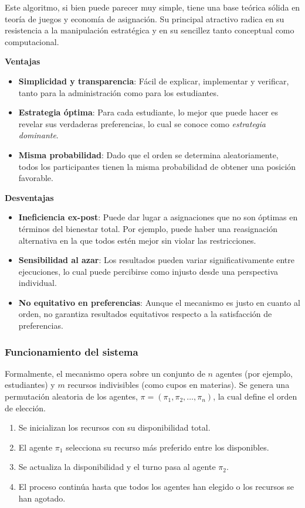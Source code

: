 \documentclass{article}
\begin{document}
Este algoritmo, si bien puede parecer muy simple, tiene una base teórica sólida en teoría de juegos y economía de asignación. Su principal atractivo radica en su resistencia a la manipulación estratégica y en su sencillez tanto conceptual como computacional.

\textbf{Ventajas}
\begin{itemize}
    \item \textbf{Simplicidad y transparencia}: Fácil de explicar, implementar y verificar, tanto para la administración como para los estudiantes.
    \item \textbf{Estrategia óptima}: Para cada estudiante, lo mejor que puede hacer es revelar sus verdaderas preferencias, lo cual se conoce como \textit{estrategia dominante}.
    \item \textbf{Misma probabilidad}: Dado que el orden se determina aleatoriamente, todos los participantes tienen la misma probabilidad de obtener una posición favorable.
\end{itemize}

\textbf{Desventajas}
\begin{itemize}
    \item \textbf{Ineficiencia ex-post}: Puede dar lugar a asignaciones que no son óptimas en términos del bienestar total. Por ejemplo, puede haber una reasignación alternativa en la que todos estén mejor sin violar las restricciones.
    \item \textbf{Sensibilidad al azar}: Los resultados pueden variar significativamente entre ejecuciones, lo cual puede percibirse como injusto desde una perspectiva individual.
    \item \textbf{No equitativo en preferencias}: Aunque el mecanismo es justo en cuanto al orden, no garantiza resultados equitativos respecto a la satisfacción de preferencias.
\end{itemize}

\subsubsection{Funcionamiento del sistema}

Formalmente, el mecanismo opera sobre un conjunto de $n$ agentes (por ejemplo, estudiantes) y $m$ recursos indivisibles (como cupos en materias). Se genera una permutación aleatoria de los agentes, $\pi = (\pi_1, \pi_2, \ldots, \pi_n)$, la cual define el orden de elección.

\begin{enumerate}
    \item Se inicializan los recursos con su disponibilidad total.
    \item El agente $\pi_1$ selecciona su recurso más preferido entre los disponibles.
    \item Se actualiza la disponibilidad y el turno pasa al agente $\pi_2$.
    \item El proceso continúa hasta que todos los agentes han elegido o los recursos se han agotado.
\end{enumerate}
\end{document}
